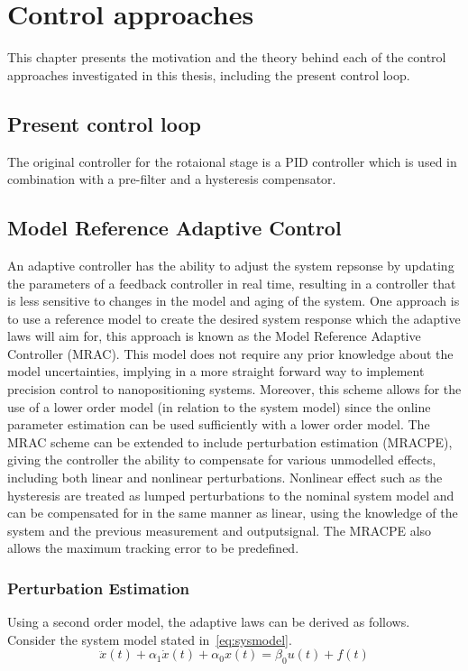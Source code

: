\chapter{Control approaches}\label{cha:modelling}
This chapter presents the motivation and the theory behind each of the control approaches investigated in this thesis, including the present control loop.

\section{Present control loop}
The original controller for the rotaional stage is a PID controller which is used in combination with a pre-filter and a hysteresis compensator.

\section{Model Reference Adaptive Control}
An adaptive controller has the ability to adjust the system repsonse by updating the parameters of a feedback controller in real time, resulting in a controller that is less sensitive to changes in the model and aging of the system. One approach is to use a reference model to create the desired system response which the adaptive laws will aim for, this approach is known as the Model Reference Adaptive Controller (MRAC). This model does not require any prior knowledge about the model uncertainties, implying in a more straight forward way to implement precision control to nanopositioning systems. Moreover, this scheme allows for the use of a lower order model (in relation to the system model) since the online parameter estimation can be used sufficiently with a lower order model. The MRAC scheme can be extended to include perturbation estimation (MRACPE), giving the controller the ability to compensate for various unmodelled effects, including both linear and nonlinear perturbations. Nonlinear effect such as the hysteresis are treated as lumped perturbations to the nominal system model and can be compensated for in the same manner as linear, using the knowledge of the system and the previous measurement and outputsignal. The MRACPE also allows the maximum tracking error to be predefined.


\subsection{Perturbation Estimation}
Using a second order model, the adaptive laws can be derived as follows. Consider the system model stated in~\eqref{eq:sysmodel}.
\begin{equation}
  \label{eq:sysmodel}
  \ddot{x}(t) + \alpha_1\dot{x}(t) +  \alpha_0x(t) = \beta_0u(t) + f(t)
\end{equation}

